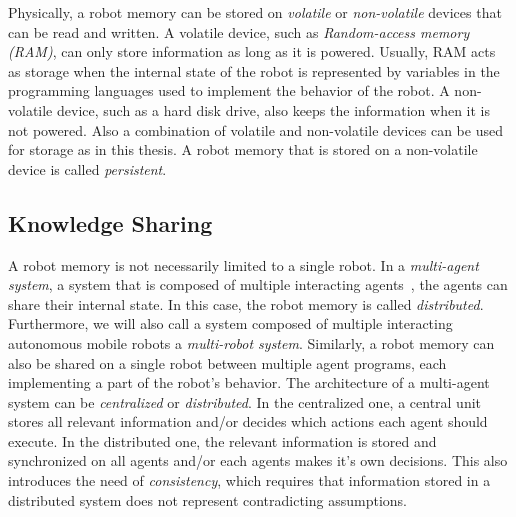 Physically, a robot memory can be stored on \emph{volatile} or
\emph{non-volatile} devices that can be read and written. A volatile
device, such as \emph{Random-access memory (RAM)}, can only store
information as long as it is powered. Usually, RAM acts as storage
when the internal state of the robot is represented by variables in
the programming languages used to implement the behavior of the
robot.  A non-volatile device, such as a hard disk drive, also keeps
the information when it is not powered. Also a combination of volatile
and non-volatile devices can be used for storage as in this thesis. A
robot memory that is stored on a non-volatile device is called
\emph{persistent}.

\subsection{Knowledge Sharing}
\label{sec:knowledge-sharing}
A robot memory is not necessarily limited to a single robot. In a
\emph{multi-agent system}, a system that is composed of multiple
interacting agents~\cite{multiagentsystems}, the agents can share
their internal state. In this case, the robot memory is called
\emph{distributed}. Furthermore, we will also call a system composed
of multiple interacting autonomous mobile robots a \emph{multi-robot
  system}. Similarly, a robot memory can also be shared on a single
robot between multiple agent programs, each implementing a part of
the robot's behavior. The architecture of a multi-agent system can be
\emph{centralized} or \emph{distributed}. In the centralized one,
a central unit stores all relevant information and/or decides which
actions each agent should execute. In the distributed one, the
relevant information is stored and synchronized on all agents and/or
each agents makes it's own decisions. This also introduces the need of
\emph{consistency}, which requires that information stored in a
distributed system does not represent contradicting assumptions.

